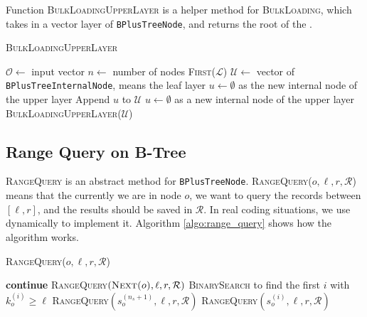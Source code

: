 Function \textsc{BulkLoadingUpperLayer} is a helper method for \textsc{BulkLoading}, which takes in a vector layer of \texttt{BPlusTreeNode}, and returns the root of the \bplustree.

\begin{algorithm}
	\caption{\textsc{BulkLoadingUpperLayer}}
	\begin{algorithmic}
        \State $\mathcal{O} \leftarrow $ input vector
        \State $n\leftarrow$ number of nodes
        \State\Return \textsc{First($\mathcal{L}$)}
        \EndIf
        \State $\mathcal{U} \leftarrow $ vector of \texttt{BPlusTreeInternalNode}, means the leaf layer
        \State $u \leftarrow\emptyset$ as the new internal node of the upper layer
            \State Append $u$ to $\mathcal{U}$
            \State $u\leftarrow\emptyset$ as a new internal node of the upper layer
        \EndIf
        \EndFor
        \State \Return \textsc{BulkLoadingUpperLayer($\mathcal{U}$)}
	\end{algorithmic} 
\end{algorithm}

\subsection{Range Query on B-Tree}

\textsc{RangeQuery} is an abstract method for \texttt{BPlusTreeNode}. \textsc{RangeQuery($o, \ell, r, \mathcal{R}$)} means that the currently we are in node $o$, we want to query the records between $[\ell, r]$, and the results should be saved in $\mathcal{R}$. In real coding situations, we use dynamically to implement it. Algorithm \ref{algo:range_query} shows how the algorithm works.

\begin{algorithm}
\caption{\textsc{RangeQuery($o, \ell, r, \mathcal{R}$)}}\label{algo:range_query}
	\begin{algorithmic}
        \For{$i\in[0, n)$}
        \State \textbf{continue}
        \EndIf
        \State\Return
        \EndIf
        \EndFor
            \State\textsc{RangeQuery$\left(\textsc{Next($o$)}, \ell, r, \mathcal{R}\right)$}
        \Else
        \State \textsc{BinarySearch} to find the first $i$ with $k_o^{(i)}\ge \ell$
            \State \textsc{RangeQuery$\left(s_{o}^{\left(n_s+1\right)}, \ell, r, \mathcal{R}\right)$}
        \Else
            \State \textsc{RangeQuery$\left(s_{o}^{\left(i\right)}, \ell, r, \mathcal{R}\right)$}
        \EndIf
        \EndIf
    \end{algorithmic} 
\end{algorithm}
